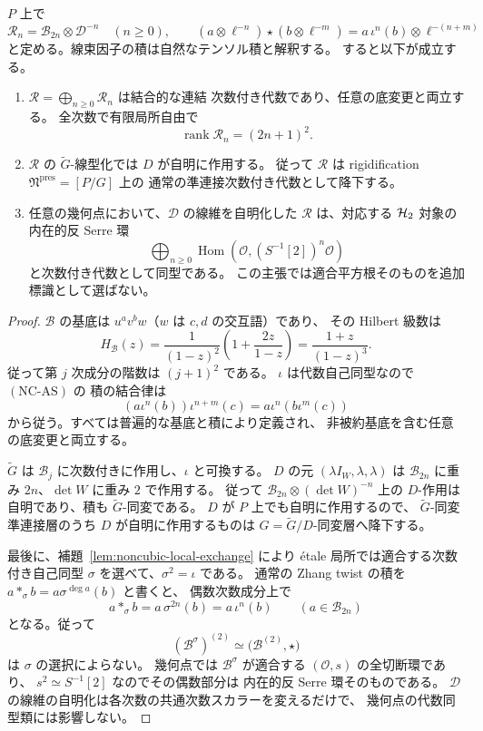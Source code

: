 \begin{proposition}
\label{prop:noncubic-antiserre-descent}
$P$ 上で
\[
 \mathcal R_n=\mathcal B_{2n}\otimes\mathcal D^{-n}
 \quad(n\ge0),\qquad
 (a\otimes\ell^{-n})\star(b\otimes\ell^{-m})
 =a\,\iota^n(b)\otimes\ell^{-(n+m)}
 \tag{NC-AS}\label{eq:noncubic-antiserre-product}
\]
と定める。線束因子の積は自然なテンソル積と解釈する。
すると以下が成立する。
\begin{enumerate}
\item $\mathcal R=\bigoplus_{n\ge0}\mathcal R_n$ は結合的な連結
  次数付き代数であり、任意の底変更と両立する。
  全次数で有限局所自由で
  \[
    \operatorname{rank}\mathcal R_n=(2n+1)^2.
  \]
\item $\mathcal R$ の $\widetilde G$-線型化では $D$ が自明に作用する。
  従って $\mathcal R$ は rigidification
  $\mathfrak N^{\mathrm{pres}}=[P/G]$ 上の
  通常の準連接次数付き代数として降下する。
\item 任意の幾何点において、$\mathcal D$ の線維を自明化した
  $\mathcal R$ は、対応する $\mathcal H_2$ 対象の内在的反 Serre 環
  \[
    \bigoplus_{n\ge0}
       \operatorname{Hom}(\mathcal O,(S^{-1}[2])^n\mathcal O)
  \]
  と次数付き代数として同型である。
  この主張では適合平方根そのものを追加標識として選ばない。
\end{enumerate}
\end{proposition}
\begin{proof}
$\mathcal B$ の基底は $u^av^bw$（$w$ は $c,d$ の交互語）であり、
その Hilbert 級数は
\[
 H_{\mathcal B}(z)
 =\frac1{(1-z)^2}\left(1+\frac{2z}{1-z}\right)
 =\frac{1+z}{(1-z)^3}.
\]
従って第 $j$ 次成分の階数は $(j+1)^2$ である。
$\iota$ は代数自己同型なので $(\mathrm{NC\text{-}AS})$ の
積の結合律は
\[
 (a\iota^n(b))\iota^{n+m}(c)
 =a\iota^n(b\iota^m(c))
\]
から従う。すべては普遍的な基底と積により定義され、
非被約基底を含む任意の底変更と両立する。

$\widetilde G$ は $\mathcal B_j$ に次数付きに作用し、$\iota$ と可換する。
$D$ の元 $(\lambda I_W,\lambda,\lambda)$ は
$\mathcal B_{2n}$ に重み $2n$、$\det W$ に重み $2$ で作用する。
従って $\mathcal B_{2n}\otimes(\det W)^{-n}$ 上の
$D$-作用は自明であり、積も $\widetilde G$-同変である。
$D$ が $P$ 上でも自明に作用するので、
$\widetilde G$-同変準連接層のうち $D$ が自明に作用するものは
$G=\widetilde G/D$-同変層へ降下する。

最後に、補題~\ref{lem:noncubic-local-exchange} により
\'etale 局所では適合する次数付き自己同型
$\sigma$ を選べて、$\sigma^2=\iota$ である。
通常の Zhang twist の積を
$a*_\sigma b=a\sigma^{\deg a}(b)$ と書くと、
偶数次数成分上で
\[
 a*_\sigma b=a\,\sigma^{2n}(b)
              =a\,\iota^n(b)
       \qquad(a\in\mathcal B_{2n})
\]
となる。従って
\[
 (\mathcal B^\sigma)^{(2)}
 \simeq\bigl(\mathcal B^{(2)},\star\bigr)
\]
は $\sigma$ の選択によらない。
幾何点では $\mathcal B^\sigma$ が適合する
$(\mathcal O,s)$ の全切断環であり、
$s^2\simeq S^{-1}[2]$ なのでその偶数部分は
内在的反 Serre 環そのものである。
$\mathcal D$ の線維の自明化は各次数の共通次数スカラーを変えるだけで、
幾何点の代数同型類には影響しない。
\end{proof}

